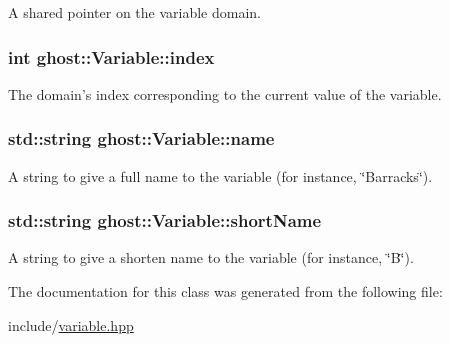 A shared pointer on the variable domain. 

\hypertarget{classghost_1_1Variable_a934efa463fb1897b4266040e321dbc41}{
\subsubsection[{index}]{\setlength{\rightskip}{0pt plus 5cm}int ghost\-::\-Variable\-::index\hspace{0.3cm}{\ttfamily [protected]}}}\label{classghost_1_1Variable_a934efa463fb1897b4266040e321dbc41}


The domain's index corresponding to the current value of the variable. 

\hypertarget{classghost_1_1Variable_a0f9fbecc12e22224c65ed6d8ce4cb507}{
\subsubsection[{name}]{\setlength{\rightskip}{0pt plus 5cm}std\-::string ghost\-::\-Variable\-::name\hspace{0.3cm}{\ttfamily [protected]}}}\label{classghost_1_1Variable_a0f9fbecc12e22224c65ed6d8ce4cb507}


A string to give a full name to the variable (for instance, \char`\"{}\-Barracks\char`\"{}). 

\hypertarget{classghost_1_1Variable_af0a8a6632b981ae0ff22cf4dc62495d3}{
\subsubsection[{short\-Name}]{\setlength{\rightskip}{0pt plus 5cm}std\-::string ghost\-::\-Variable\-::short\-Name\hspace{0.3cm}{\ttfamily [protected]}}}\label{classghost_1_1Variable_af0a8a6632b981ae0ff22cf4dc62495d3}


A string to give a shorten name to the variable (for instance, \char`\"{}\-B\char`\"{}). 



The documentation for this class was generated from the following file\-:\begin{DoxyCompactItemize}
\item 
include/\hyperlink{variable_8hpp}{variable.\-hpp}\end{DoxyCompactItemize}
